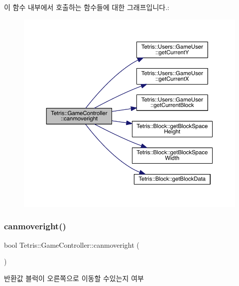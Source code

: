 이 함수 내부에서 호출하는 함수들에 대한 그래프입니다.\+:
\nopagebreak
\begin{figure}[H]
\begin{center}
\leavevmode
\includegraphics[width=350pt]{db/dd2/class_tetris_1_1_game_controller_a6c8189bb893502049396a7de1a73a88c_cgraph}
\end{center}
\end{figure}
\mbox{\label{class_tetris_1_1_game_controller_a6c8189bb893502049396a7de1a73a88c}} 
\subsubsection{\texorpdfstring{canmoveright()}{canmoveright()}\hspace{0.1cm}{\footnotesize\ttfamily [2/2]}}
{\footnotesize\ttfamily bool Tetris\+::\+Game\+Controller\+::canmoveright (\begin{DoxyParamCaption}{ }\end{DoxyParamCaption})\hspace{0.3cm}{\ttfamily [inline]}}

\begin{DoxyReturn}{반환값}
블럭이 오른쪽으로 이동할 수있는지 여부 
\end{DoxyReturn}



